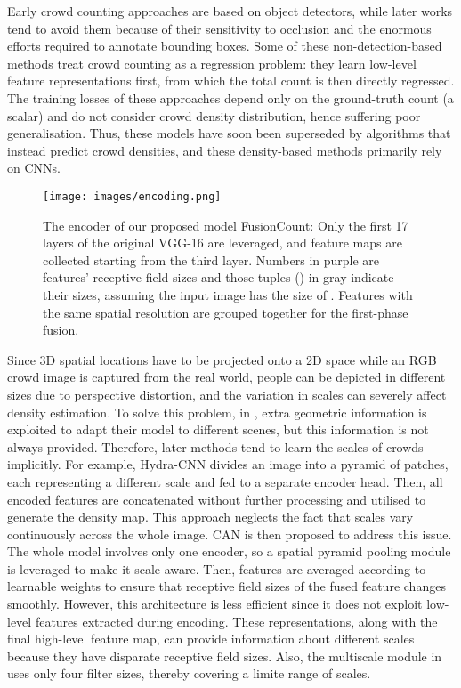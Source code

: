 \documentclass{article}
\begin{document}
Early crowd counting approaches \cite{983420, 4761705, 5206621} are based on object detectors, while later works tend to avoid them because of their sensitivity to occlusion and the enormous efforts required to annotate bounding boxes. Some of these non-detection-based methods \cite{lempitsky2010learning, 5459191, chen2012feature, 6619163} treat crowd counting as a regression problem: they learn low-level feature representations first, from which the total count is then directly regressed. The training losses of these approaches depend only on the ground-truth count (a scalar) and do not consider crowd density distribution, hence suffering poor generalisation. Thus, these models have soon been superseded by algorithms \cite{CP-CNN, Hydra-CNN, CAN, M-SFANet} that instead predict crowd densities, and these density-based methods primarily rely on CNNs.

\begin{figure*}[t]
    \centering
    \texttt{[image: images/encoding.png]}
    \caption{The encoder of our proposed model FusionCount: Only the first 17 layers of the original VGG-16 are leveraged, and feature maps are collected starting from the third layer. Numbers in \textcolor{MyPurple}{purple} are features' receptive field sizes and those tuples () in \textcolor{MyGray}{gray} indicate their sizes, assuming the input image has the size of . Features with the same spatial resolution are grouped together for the first-phase fusion.}
    \label{fig:encoder}
\end{figure*}

Since 3D spatial locations have to be projected onto a 2D space while an RGB crowd image is captured from the real world, people can be depicted in different sizes due to perspective distortion, and the variation in scales can severely affect density estimation. To solve this problem, in \cite{Geometric}, extra geometric information is exploited to adapt their model to different scenes, but this information is not always provided. Therefore, later methods tend to learn the scales of crowds implicitly. For example, Hydra-CNN \cite{Hydra-CNN} divides an image into a pyramid of patches, each representing a different scale and fed to a separate encoder head. Then, all encoded features are concatenated without further processing and utilised to generate the density map. This approach neglects the fact that scales vary continuously across the whole image. CAN \cite{CAN} is then proposed to address this issue. The whole model involves only one encoder, so a spatial pyramid pooling module \cite{SpatialPyramidPooling} is leveraged to make it scale-aware. Then, features are averaged according to learnable weights to ensure that receptive field sizes of the fused feature changes smoothly. However, this architecture is less efficient since it does not exploit low-level features extracted during encoding. These representations, along with the final high-level feature map, can provide information about different scales because they have disparate receptive field sizes. Also, the multiscale module in \cite{CAN} uses only four filter sizes, thereby covering a limite range of scales.
 
\end{document}
